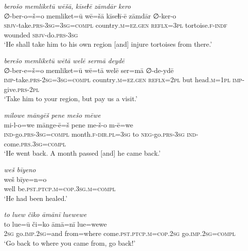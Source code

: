 \ea \label{DG.65}
\textit{berošo memliketū wēšā, kīseɫē zāmdār kero} \\ 
\gll ∅-ber-o=š=o memliket=ū wē=šā kīseɫī-ē zāmdār ∅-ker-o \\ 
 \textsc{sbjv-}take\textsc{.prs}\textsc{-3sg}\textsc{=3sg}\textsc{=\textsc{compl}} country\textsc{.m}\textsc{=ez}\textsc{.gen} \textsc{reflx}\textsc{=3pl} tortoise\textsc{\textsc{.f}}\textsc{-indf} wounded \textsc{sbjv-}do\textsc{.prs}\textsc{-3sg} \\ 
\glt `He shall take him to his own region [and] injure tortoises from there.'
\z 
 
\ea \label{DG.68}
\textit{berešo memliketū wētā welē sermā deydē} \\ 
\gll ∅-ber-e=š=o memliket=ū wē=tā welē ser=mā ∅-de-ydē \\ 
 \textsc{imp-}take\textsc{.prs}-\textsc{2sg}\textsc{=3sg}\textsc{=\textsc{compl}} country\textsc{.m}\textsc{=ez}\textsc{.gen} \textsc{reflx}\textsc{=2pl} but head\textsc{.m}\textsc{=1pl} \textsc{imp-}give\textsc{.prs}\textsc{-2pl} \\ 
\glt `Take him to your region, but pay us a visit.'
\z 
 
\ea \label{DG.69}
\textit{milowe māngēš pene mešo mēwe} \\ 
\gll mi-l-o=we mānge-ē=š pene me-š-o m-ē=we \\ 
 \textsc{ind-}go\textsc{.prs}\textsc{-3sg}\textsc{=\textsc{compl}} month\textsc{\textsc{.f}}\textsc{-dir}\textsc{.pl}\textsc{=3sg} to \textsc{neg-}go\textsc{.prs}\textsc{-3sg} \textsc{ind-}come\textsc{.prs}\textsc{.3sg}\textsc{=compl} \\ 
\glt `He went back. A month passed [and] he came back.'
\z 
 
\ea \label{DG.71}
\textit{weš bīyeno} \\ 
\gll weš bīye=n=o \\ 
 well be\textsc{.pst}\textsc{.ptcp}\textsc{.m}\textsc{=cop}\textsc{.3sg}\textsc{.m}\textsc{=compl} \\ 
\glt `He had been healed.'
\z 
 
\ea \label{DP.24}
\textit{to luew čiko āmānī luewewe} \\ 
\gll to lue=ū či=ko āmā=nī lue=wewe \\ 
 \textsc{2sg} go\textsc{.imp}\textsc{.\textsc{2sg}}=and from=where come\textsc{.pst}\textsc{.ptcp}\textsc{.m}\textsc{=cop}\textsc{.\textsc{2sg}} go\textsc{.imp}\textsc{.\textsc{2sg}}\textsc{=compl} \\ 
\glt `Go back to where you came from, go back!'
\z 
 
